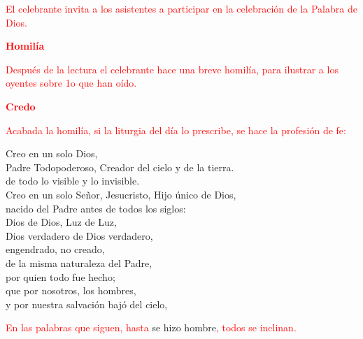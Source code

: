 \documentclass[12pt, letterpaper]{report}
\begin{document}
\large {\textcolor{red}{El celebrante invita a los asistentes a participar en la celebraci\'on de la Palabra de Dios.}} 

\Large {\bfseries \textcolor{red}{Homil\'ia}}

\large {\textcolor{red}{Despu\'es de la lectura el celebrante hace una breve homil\'ia, para ilustrar a los oyentes sobre 1o que han o\'ido.}}

\Large {\bfseries \textcolor{red}{Credo}}

\large {\textcolor{red}{Acabada la homil\'ia, si la liturgia del d\'ia lo prescribe, se hace la profesi\'on de fe:}}

\noindent
\Large {Creo en un solo Dios,\\
    Padre Todopoderoso, Creador del cielo y de la tierra.\\
    de todo lo visible y lo invisible.\\
    Creo en un solo Se\~nor, Jesucristo, Hijo \'unico de Dios,\\
    nacido del Padre antes de todos los siglos:\\
    Dios de Dios, Luz de Luz,\\
    Dios verdadero de Dios verdadero,\\
    engendrado, no creado,\\
    de la misma naturaleza del Padre,\\
    por quien todo fue hecho;\\
    que por nosotros, los hombres,\\
    y por nuestra salvaci\'on baj\'o del cielo,
}

\large {\textcolor{red}{En las palabras que siguen, hasta} se hizo hombre\textcolor{red}{, todos se inclinan.}}
\end{document}
